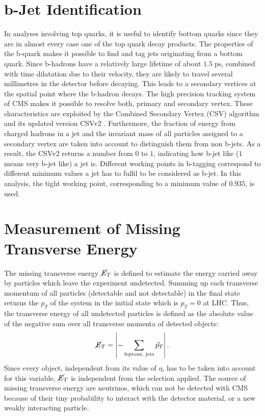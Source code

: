 \section{b-Jet Identification}
\label{sec:btag}
	In analyses involving top quarks, it is useful to identify bottom quarks since they are in almost every case one of the top quark decay products. The properties of the b-quark makes it possible to find and tag jets originating from a bottom quark. Since b-hadrons have a relatively large lifetime of about $1.5\;\text{ps}$, combined with time dilatation due to their velocity, they are likely to travel several millimetres in the detector before decaying. This leads to a secondary vertices at the spatial point where the b-hadron decays. The high precision tracking system of CMS makes it possible to resolve both, primary and secondary vertex. These characteristics are exploited by the Combined Secondary Vertex (CSV) algorithm \cite{csv} and its updated version CSVv2 \cite{btag}. Furthermore, the fraction of energy from charged hadrons in a jet and the invariant mass of all particles assigned to a secondary vertex are taken into account to distinguish them from non b-jets. As a result, the CSVv2 returns a number from $0$ to $1$, indicating how b-jet like ($1$ means very b-jet like) a jet is. Different working points \cite{btagperf} in b-tagging correspond to different minimum values a jet has to fulfil to be considered as b-jet. In this analysis, the tight working point, corresponding to a minimum value of $0.935$, is used. 
	
\section{Measurement of Missing Transverse Energy}
	The missing transverse energy $\cancel{E}_T$ is defined to estimate the energy carried away by particles which leave the experiment undetected. Summing up each transverse momentum of all particles (detectable and not detectable) in the final state returns the $p_T$ of the system in the initial state which is $p_T = 0$ at LHC. Thus, the transverse energy of all undetected particles is defined as the absolute value of the negative sum over all transverse momenta of detected objects:
	\begin{equation}
		\cancel{E}_T = \left| - \sum_{\textrm{leptons, jets}}^{} \vec{p}_T \right|.
		\label{eq:MET}
	\end{equation}	
	Since every object, independent from its value of $\eta$, has to be taken into account for this variable, $\cancel{E}_T$ is independent from the selection applied. The source of missing transverse energy are neutrinos, which can not be detected with CMS because of their tiny probability to interact with the detector material, or a new weakly interacting particle. 

